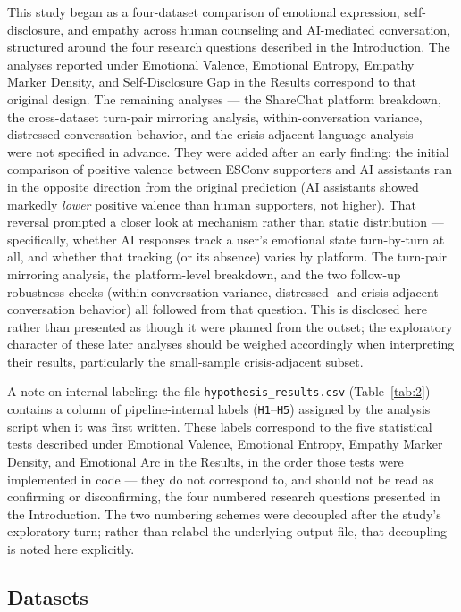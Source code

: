 \documentclass[11pt]{article}
\begin{document}
This study began as a four-dataset comparison of emotional expression, self-disclosure, and empathy across human counseling and AI-mediated conversation, structured around the four research questions described in the Introduction. The analyses reported under Emotional Valence, Emotional Entropy, Empathy Marker Density, and Self-Disclosure Gap in the Results correspond to that original design. The remaining analyses --- the ShareChat platform breakdown, the cross-dataset turn-pair mirroring analysis, within-conversation variance, distressed-conversation behavior, and the crisis-adjacent language analysis --- were not specified in advance. They were added after an early finding: the initial comparison of positive valence between ESConv supporters and AI assistants ran in the opposite direction from the original prediction (AI assistants showed markedly \emph{lower} positive valence than human supporters, not higher). That reversal prompted a closer look at mechanism rather than static distribution --- specifically, whether AI responses track a user's emotional state turn-by-turn at all, and whether that tracking (or its absence) varies by platform. The turn-pair mirroring analysis, the platform-level breakdown, and the two follow-up robustness checks (within-conversation variance, distressed- and crisis-adjacent-conversation behavior) all followed from that question. This is disclosed here rather than presented as though it were planned from the outset; the exploratory character of these later analyses should be weighed accordingly when interpreting their results, particularly the small-sample crisis-adjacent subset.

A note on internal labeling: the file \texttt{hypothesis\_results.csv} (Table~\ref{tab:2}) contains a column of pipeline-internal labels (\texttt{H1}--\texttt{H5}) assigned by the analysis script when it was first written. These labels correspond to the five statistical tests described under Emotional Valence, Emotional Entropy, Empathy Marker Density, and Emotional Arc in the Results, in the order those tests were implemented in code --- they do not correspond to, and should not be read as confirming or disconfirming, the four numbered research questions presented in the Introduction. The two numbering schemes were decoupled after the study's exploratory turn; rather than relabel the underlying output file, that decoupling is noted here explicitly.

\subsection{Datasets}
\end{document}
